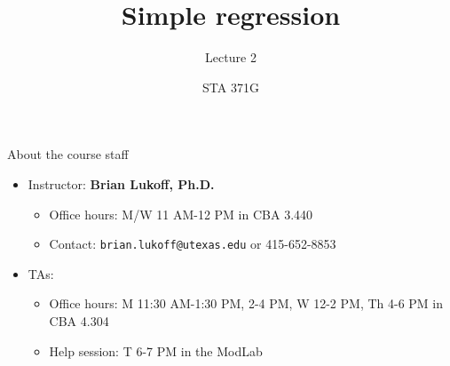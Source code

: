 \documentclass{beamer}
\title{Simple regression}
\subtitle{Lecture 2}
\author{STA 371G}
\begin{document}
  

  \frame{\maketitle}



  \begin{darkframes}
    \begin{frame}{About the course staff}
      \begin{itemize}
        \item Instructor: \textbf{Brian Lukoff, Ph.D.}
          \begin{itemize}
            \item Office hours: M/W 11 AM-12 PM in CBA 3.440
            \item Contact: \texttt{brian.lukoff@utexas.edu} or 415-652-8853
          \end{itemize}
        \item TAs:
          \begin{itemize}
            \item Office hours: M 11:30 AM-1:30 PM, 2-4 PM, W 12-2 PM, Th 4-6 PM in CBA 4.304
            \item Help session: T 6-7 PM in the ModLab
          \end{itemize}


\end{itemize}
\end{frame}
\end{darkframes}
\end{document}
